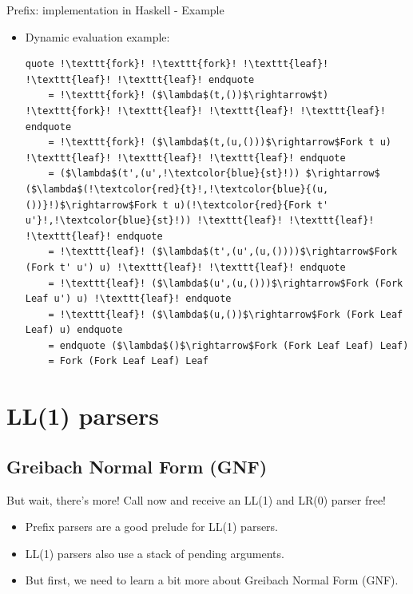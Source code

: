 \documentclass[10pt]{beamer}
\begin{document}
\begin{frame}[fragile]{Prefix: implementation in Haskell - Example}

\begin{itemize}

\begin{lstlisting}[mathescape=true, escapechar=!]
fork$^\circ$ ctx = $\lambda$(t,(u,st)) $\rightarrow$ ctx(!\textbf{Fork}! t u,st)
leaf$^\circ$ ctx = $\lambda$st $\rightarrow$ ctx(!\textbf{Leaf}!,st)
\end{lstlisting}

\item Dynamic evaluation example:

\begin{lstlisting}[mathescape=true, escapechar=!,frame=none,basicstyle=\small]
	quote !\texttt{fork}! !\texttt{fork}! !\texttt{leaf}! !\texttt{leaf}! !\texttt{leaf}! endquote
	= !\texttt{fork}! ($\lambda$(t,())$\rightarrow$t) !\texttt{fork}! !\texttt{leaf}! !\texttt{leaf}! !\texttt{leaf}! endquote
	= !\texttt{fork}! ($\lambda$(t,(u,()))$\rightarrow$Fork t u) !\texttt{leaf}! !\texttt{leaf}! !\texttt{leaf}! endquote
	= ($\lambda$(t',(u',!\textcolor{blue}{st}!)) $\rightarrow$ ($\lambda$(!\textcolor{red}{t}!,!\textcolor{blue}{(u,())}!)$\rightarrow$Fork t u)(!\textcolor{red}{Fork t' u'}!,!\textcolor{blue}{st}!)) !\texttt{leaf}! !\texttt{leaf}! !\texttt{leaf}! endquote
	= !\texttt{leaf}! ($\lambda$(t',(u',(u,())))$\rightarrow$Fork (Fork t' u') u) !\texttt{leaf}! !\texttt{leaf}! endquote
	= !\texttt{leaf}! ($\lambda$(u',(u,()))$\rightarrow$Fork (Fork Leaf u') u) !\texttt{leaf}! endquote
	= !\texttt{leaf}! ($\lambda$(u,())$\rightarrow$Fork (Fork Leaf Leaf) u) endquote
	= endquote ($\lambda$()$\rightarrow$Fork (Fork Leaf Leaf) Leaf)
	= Fork (Fork Leaf Leaf) Leaf
\end{lstlisting}

\end{itemize}

\end{frame}

\section{LL(1) parsers}
\subsection{Greibach Normal Form (GNF)}

\begin{frame}[fragile]{But wait, there's more! Call now and receive an LL(1) and LR(0) parser free!}

\begin{itemize}

\item Prefix parsers are a good prelude for LL(1) parsers.
\item LL(1) parsers also use a stack of pending arguments.
\item But first, we need to learn a bit more about Greibach Normal Form (GNF).

\end{itemize}

\end{frame}
\end{document}
